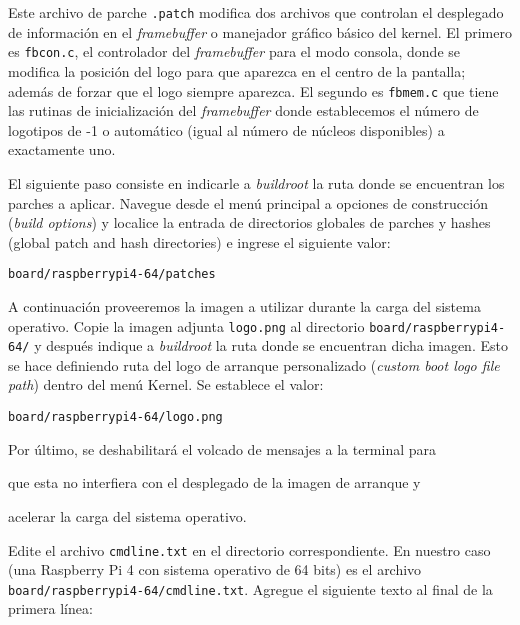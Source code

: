 Este archivo de parche \texttt{.patch} modifica dos archivos que controlan el desplegado de información en el \emph{framebuffer} o manejador gráfico básico del kernel.
El primero es \texttt{fbcon.c}, el controlador del \emph{framebuffer} para el modo consola, donde se modifica la posición del logo para que aparezca en el centro de la pantalla; además de forzar que el logo siempre aparezca.
El segundo es \texttt{fbmem.c} que tiene las rutinas de inicialización del \emph{framebuffer} donde establecemos el número de logotipos de -1 o automático (igual al número de núcleos disponibles) a exactamente uno.

\begin{samepage}
El siguiente paso consiste en indicarle a \emph{buildroot} la ruta donde se encuentran los parches a aplicar.
Navegue desde el menú principal a opciones de construcción (\emph{build options}) y localice la entrada de directorios globales de parches y hashes (global patch and hash directories) e ingrese el siguiente valor:

\begin{Verbatim}[gobble=1]
	board/raspberrypi4-64/patches
\end{Verbatim}
\end{samepage}

\begin{samepage}
A continuación proveeremos la imagen a utilizar durante la carga del sistema operativo.
Copie la imagen adjunta \texttt{logo.png} al directorio \texttt{board/raspberrypi4-64/} y después indique a \emph{buildroot} la ruta donde se encuentran dicha imagen.
Esto se hace definiendo ruta del logo de arranque personalizado (\emph{custom boot logo file path}) dentro del menú Kernel.
Se establece el valor:
\begin{Verbatim}[gobble=1]
	board/raspberrypi4-64/logo.png
\end{Verbatim}
\end{samepage}

Por último, se deshabilitará el volcado de mensajes a la terminal para
\begin{enumerate*}[label=\roman*\rpar]
	\item que esta no interfiera con el desplegado de la imagen de arranque
	y
	\item acelerar la carga del sistema operativo.
\end{enumerate*}

Edite el archivo \texttt{cmdline.txt} en el directorio correspondiente.
En nuestro caso (una Raspberry Pi 4 con sistema operativo de 64 bits) es el archivo \texttt{board/raspberrypi4-64/cmdline.txt}.
Agregue el siguiente texto al final de la primera línea:


